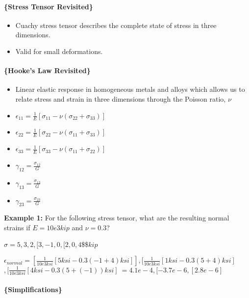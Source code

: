 \documentclass[
]{article}
\providecommand{\tightlist}{%
  \setlength{\itemsep}{0pt}\setlength{\parskip}{0pt}}
\begin{document}
\hypertarget{stress-tensor-revisited}{%
\paragraph{\{Stress Tensor Revisited\}}\label{stress-tensor-revisited}}

{}

\begin{itemize}
\tightlist
\item
  Cuachy stress tensor describes the complete state of stress in three
  dimensions.
\item
  Valid for small deformations.
\end{itemize}

\hypertarget{hookes-law-revisited}{%
\paragraph{\{Hooke's Law Revisited\}}\label{hookes-law-revisited}}

\begin{itemize}
\tightlist
\item
  Linear elastic response in homogeneous metals and alloys which allows
  us to relate stress and strain in three dimensions through the Poisson
  ratio, \(\nu\)
\item
  \(\epsilon_{11} = \frac{1}{E}[\sigma_{11} - \nu(\sigma_{22} + \sigma_{33})]\)
\item
  \(\epsilon_{22} = \frac{1}{E}[\sigma_{22} - \nu(\sigma_{11} + \sigma_{33})]\)
\item
  \(\epsilon_{33} = \frac{1}{E}[\sigma_{33} - \nu(\sigma_{11} + \sigma_{22})]\)
\item
  \(\gamma_{12} = \frac{\sigma_{12}}{G}\)
\item
  \(\gamma_{13} = \frac{\sigma_{13}}{G}\)
\item
  \(\gamma_{23} = \frac{\sigma_{23}}{G}\)
\end{itemize}

\textbf{Example 1:} For the following stress tensor, what are the
resulting normal strains if \(E = 10e3 kip\) and \(\nu = 0.3\)?

\(\sigma = 5, 3, 2\)\(, [3, -1, 0\)\(, [2, 0, 4\)\$\$\(kip\)

\(\epsilon_{normal} = [\frac{1}{10e3 ksi}[5 ksi - 0.3(-1 + 4)ksi]], [\frac{1}{10e3 ksi}[1 ksi - 0.3(5 + 4)ksi]\)\(, [\frac{1}{10e3 ksi}[4 ksi - 0.3(5 + (-1))ksi]\ = 4.1e-4\)\(, [-3.7e-6\)\(, [2.8e-6]\ \)

\hypertarget{simplifications}{%
\paragraph{\{Simplifications\}}\label{simplifications}}
\end{document}
